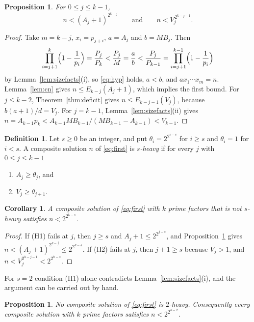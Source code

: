 \documentclass[11pt,reqno]{amsart}
\numberwithin{equation}{section}
\theoremstyle{plain}
\newtheorem{proposition}[theorem]{Proposition}
\newtheorem{corollary}[theorem]{Corollary}
\theoremstyle{definition}
\newtheorem{definition}[theorem]{Definition}
\theoremstyle{remark}
\begin{document}
\begin{proposition}\label{prop:sizebounds}
For $0\le j\le k-1$,
\[
  n<(A_j+1)^{2^{k-j}}\qquad\text{and}\qquad n<V_j^{\,2^{k-j-1}} .
\]
\end{proposition}

\begin{proof}
Take $m=k-j$, $x_i=p_{j+i}$, $a=A_j$ and $b=MB_j$. Then
\[
  \prod_{i=j+1}^{k}\Bigl(1-\frac1{p_i}\Bigr)=\frac{P_j}{P_k}
  <\frac{P_j}{M}=\frac ab<\frac{P_j}{P_{k-1}}
  =\prod_{i=j+1}^{k-1}\Bigl(1-\frac1{p_i}\Bigr)
\]
by Lemma~\ref{lem:sizefacts}(i), so \eqref{eq:hyp} holds, $a<b$, and
$ax_1\cdots x_m=n$. Lemma~\ref{lem:cn} gives $n\le E_{k-j}(A_j+1)$,
which implies the first bound. For $j\le k-2$,
Theorem~\ref{thm:deficit} gives $n\le E_{k-j-1}(V_j)$, because
$b(a+1)/d=V_j$. For $j=k-1$, Lemma~\ref{lem:sizefacts}(ii) gives
$n=A_{k-1}p_k<A_{k-1}MB_{k-1}/(MB_{k-1}-A_{k-1})<V_{k-1}$.
\end{proof}

\begin{definition}\label{def:heavy}
Let $s\ge0$ be an integer, and put $\theta_i=2^{2^{i-s}}$ for $i\ge s$
and $\theta_i=1$ for $i<s$. A composite solution $n$ of
\eqref{eq:first} is \emph{$s$-heavy} if for every $j$ with
$0\le j\le k-1$
\begin{enumerate}[label=\textup{(H\arabic*)}]
\item $A_j\ge\theta_j$, and
\item $V_j\ge\theta_{j+1}$.
\end{enumerate}
\end{definition}

\begin{corollary}\label{cor:light}
A composite solution of \eqref{eq:first} with $k$ prime factors that
is not $s$-heavy satisfies $n<2^{2^{k-s}}$.
\end{corollary}

\begin{proof}
If (H1) fails at $j$, then $j\ge s$ and $A_j+1\le2^{2^{j-s}}$, and
Proposition~\ref{prop:sizebounds} gives
$n<(A_j+1)^{2^{k-j}}\le2^{2^{k-s}}$. If (H2) fails at $j$, then
$j+1\ge s$ because $V_j>1$, and $n<V_j^{2^{k-j-1}}<2^{2^{k-s}}$.
\end{proof}

For $s=2$ condition (H1) alone contradicts
Lemma~\ref{lem:sizefacts}(i), and the argument can be carried out by
hand.

\begin{proposition}\label{prop:hand}
No composite solution of \eqref{eq:first} is $2$-heavy. Consequently
every composite solution with $k$ prime factors satisfies
$n<2^{2^{k-2}}$.
\end{proposition}
\end{document}
